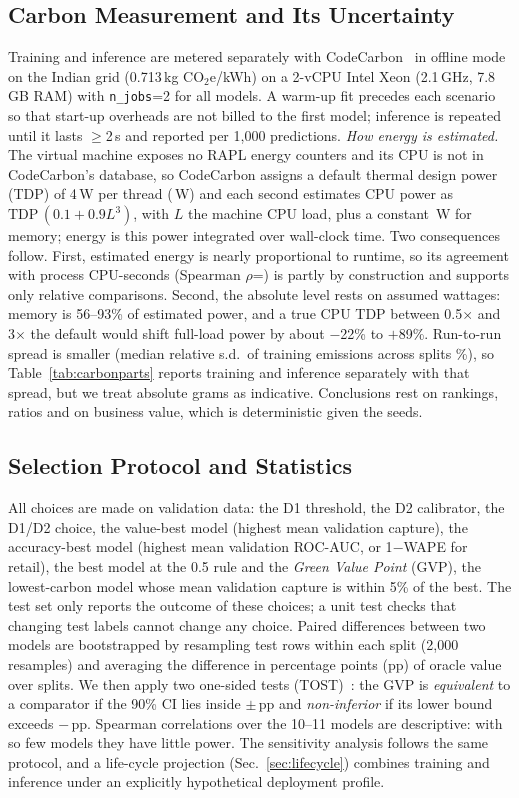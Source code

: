 \documentclass[conference]{IEEEtran}
\begin{document}
\subsection{Carbon Measurement and Its Uncertainty}\label{sec:carbon}
Training and inference are metered separately with CodeCarbon~\cite{codecarbon} in offline mode on the Indian grid
(0.713\,kg CO$_2$e/kWh) on a 2-vCPU Intel Xeon (2.1\,GHz, 7.8\,GB RAM) with \texttt{n\_jobs}=2 for all models. A warm-up
fit precedes each scenario so that start-up overheads are not billed to the first model; inference is repeated until it
lasts $\geq$2\,s and reported per 1,000 predictions. \emph{How energy is estimated.} The virtual machine exposes no RAPL
energy counters and its CPU is not in CodeCarbon's database, so CodeCarbon assigns a default thermal design power (TDP)
of 4\,W per thread (\CpuTdp\,W) and each second estimates CPU power as $\text{TDP}\,(0.1+0.9L^3)$, with $L$ the machine CPU
load, plus a constant \RamW\,W for memory; energy is this power integrated over wall-clock time. Two consequences follow.
First, estimated energy is nearly proportional to runtime, so its agreement with process CPU-seconds (Spearman
$\rho$=\EnergyCpuRho) is partly by construction and supports only relative comparisons. Second, the absolute level rests
on assumed wattages: memory is 56--93\% of estimated power, and a true CPU TDP between 0.5$\times$ and 3$\times$ the
default would shift full-load power by about $-$22\% to $+$89\%. Run-to-run spread is smaller (median relative s.d.\ of
training emissions across splits \CarbonCv\%), so Table~\ref{tab:carbonparts} reports training and inference separately
with that spread, but we treat absolute grams as indicative. Conclusions rest on rankings, ratios and on business value,
which is deterministic given the seeds.

\subsection{Selection Protocol and Statistics}
All choices are made on validation data: the D1 threshold, the D2 calibrator, the D1/D2 choice, the value-best model
(highest mean validation capture), the accuracy-best model (highest mean validation ROC-AUC, or 1$-$WAPE for retail), the
best model at the 0.5 rule and the \emph{Green Value Point} (GVP), the lowest-carbon model whose mean validation capture
is within 5\% of the best. The test set only reports the outcome of these choices; a unit test checks that changing test
labels cannot change any choice. Paired differences between two models are bootstrapped by resampling test rows
within each split (2,000 resamples) and averaging the difference in percentage points (pp) of oracle value over splits.
We then apply two one-sided tests (TOST)~\cite{schuirmann1987}: the GVP is \emph{equivalent} to a comparator if the 90\%
CI lies inside $\pm$\EqMargin\,pp and \emph{non-inferior} if its lower bound exceeds $-$\EqMargin\,pp. Spearman
correlations over the 10--11 models are descriptive: with so few models they have little power. The sensitivity
analysis follows the same protocol, and a life-cycle projection (Sec.~\ref{sec:lifecycle}) combines training and
inference under an explicitly hypothetical deployment profile.
\end{document}
